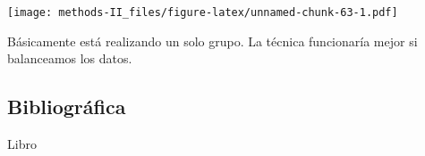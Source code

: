 \documentclass[
]{article}
\begin{document}
\texttt{[image: methods-II\_files/figure-latex/unnamed-chunk-63-1.pdf]}

Básicamente está realizando un solo grupo. La técnica funcionaría mejor
si balanceamos los datos.

\hypertarget{bibliogruxe1fica}{%
\subsection{Bibliográfica}\label{bibliogruxe1fica}}

Libro
\end{document}
